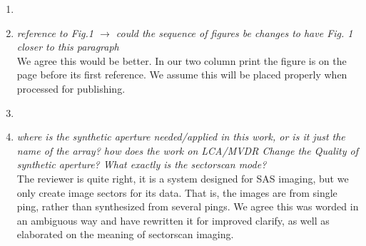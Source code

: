 \documentclass[11pt]{article} %
\newcommand\1{\vec 1}
\newcommand\q[1]{\textit{#1}}
\newcommand\qi[1]{\item\q{#1}}
\newcommand\hi[1]{\item[\textbf{#1}]}
\newcommand\ans[1]{#1}
\newcommand\ai[1]{\\[.5\baselineskip]\ans{#1}}
\begin{document}
\begin{enumerate}
%
\hi{Page 8}
\qi{reference to Fig.1 $\rightarrow$ could the sequence of figures be changes to have Fig. 1 closer to this paragraph}
\ai{We agree this would be better. In our two column print the figure is on the page before its first reference. We assume this will be placed properly when processed for publishing.}
%
\hi{Page 11}
\qi{where is the synthetic aperture needed/applied in this work, or is it just the name of the array? how does the work on LCA/MVDR Change the Quality of synthetic aperture? What exactly is the sectorscan mode?}
\ai{The reviewer is quite right, it is a system designed for SAS imaging, but we only create image sectors for its data. That is, the images are from single ping, rather than synthesized from several pings. We agree this was worded in an ambiguous way and have rewritten it for improved clarify, as well as elaborated on the meaning of sectorscan imaging.}
%
\end{enumerate}
\end{document}
